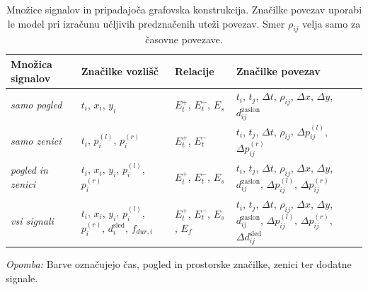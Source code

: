 \begin{table}[!htbp]
    \centering
    \caption{Množice signalov in pripadajoča grafovska konstrukcija. Značilke povezav uporabi le model  pri izračunu učljivih predznačenih uteži povezav. Smer $\rho_{ij}$ velja samo za časovne povezave.}
    \label{tab:grafovska-konstrukcija-po-mnozicah}
    \begingroup
    \small
    \begin{tabularx}{\textwidth}{@{}
        >{\raggedright\arraybackslash}p{}
        >{\raggedright\arraybackslash}p{}
        >{\raggedright\arraybackslash}p{}
        >{\raggedright\arraybackslash}X@{}}
        \toprule
        \textbf{Množica signalov} & \textbf{Značilke vozlišč} & \textbf{Relacije} & \textbf{Značilke povezav} \\
        \midrule
        \emph{samo pogled} &
        \textcolor{tableTime}{$t_i$}, \textcolor{tableGaze}{$x_i$, $y_i$} &
        \textcolor{tableTime}{$E_t^+$, $E_t^-$}, \textcolor{tableGaze}{$E_s$} &
        \textcolor{tableTime}{$t_i$, $t_j$, $\Delta t$, $\rho_{ij}$}, \textcolor{tableGaze}{$\Delta x$, $\Delta y$, $d_{ij}^{\text{zaslon}}$} \\
        \midrule
        \emph{samo zenici} &
        \textcolor{tableTime}{$t_i$}, \textcolor{tablePupil}{$p_i^{(l)}$, $p_i^{(r)}$} &
        \textcolor{tableTime}{$E_t^+$, $E_t^-$} &
        \textcolor{tableTime}{$t_i$, $t_j$, $\Delta t$, $\rho_{ij}$}, \textcolor{tablePupil}{$\Delta p_{ij}^{(l)}$, $\Delta p_{ij}^{(r)}$} \\
        \midrule
        \emph{pogled in zenici} &
        \textcolor{tableTime}{$t_i$}, \textcolor{tableGaze}{$x_i$, $y_i$}, \textcolor{tablePupil}{$p_i^{(l)}$, $p_i^{(r)}$} &
        \textcolor{tableTime}{$E_t^+$, $E_t^-$}, \textcolor{tableGaze}{$E_s$} &
        \textcolor{tableTime}{$t_i$, $t_j$, $\Delta t$, $\rho_{ij}$}, \textcolor{tableGaze}{$\Delta x$, $\Delta y$, $d_{ij}^{\text{zaslon}}$}, \textcolor{tablePupil}{$\Delta p_{ij}^{(l)}$, $\Delta p_{ij}^{(r)}$} \\
        \midrule
        \emph{vsi signali} &
        \textcolor{tableTime}{$t_i$}, \textcolor{tableGaze}{$x_i$, $y_i$}, \textcolor{tablePupil}{$p_i^{(l)}$, $p_i^{(r)}$}, \textcolor{tableFixation}{$d_i^{\text{sled}}$, $f_{dur,i}$} &
        \textcolor{tableTime}{$E_t^+$, $E_t^-$}, \textcolor{tableGaze}{$E_s$}, \textcolor{tableFixation}{$E_f$} &
        \textcolor{tableTime}{$t_i$, $t_j$, $\Delta t$, $\rho_{ij}$}, \textcolor{tableGaze}{$\Delta x$, $\Delta y$, $d_{ij}^{\text{zaslon}}$}, \textcolor{tablePupil}{$\Delta p_{ij}^{(l)}$, $\Delta p_{ij}^{(r)}$}, \textcolor{tableFixation}{$\Delta d_{ij}^{\text{sled}}$} \\
        \bottomrule
    \end{tabularx}
    \vspace{0.4em}
    \parbox{\textwidth}{\footnotesize \emph{Opomba:} Barve označujejo \textcolor{tableTime}{čas}, \textcolor{tableGaze}{pogled in prostorske značilke}, \textcolor{tablePupil}{zenici} ter \textcolor{tableFixation}{dodatne signale}.}
    \endgroup
\end{table}
